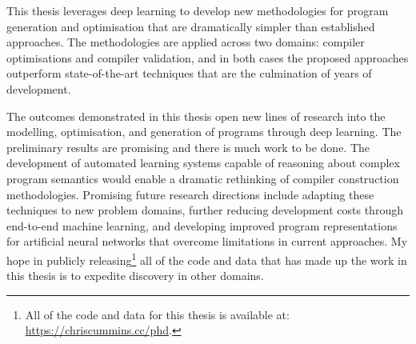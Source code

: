 This thesis leverages deep learning to develop new methodologies for program generation and optimisation that are dramatically simpler than  established approaches. The methodologies are applied across two domains: compiler optimisations and compiler validation, and in both cases the proposed approaches outperform state-of-the-art techniques that are the culmination of years of development.

The outcomes demonstrated in this thesis open new lines of research into the modelling, optimisation, and generation of programs through deep learning. The preliminary results are promising and there is much work to be done. The development of automated learning systems capable of reasoning about complex program semantics would enable a dramatic rethinking of compiler construction methodologies. Promising future research directions include adapting these techniques to new problem domains, further reducing development costs through end-to-end machine learning, and developing improved program representations for artificial neural networks that overcome limitations in current approaches. My hope in publicly releasing\footnote{All of the code and data for this thesis is available at: \url{https://chriscummins.cc/phd}.} all of the code and data that has made up the work in this thesis is to expedite discovery in other domains.
